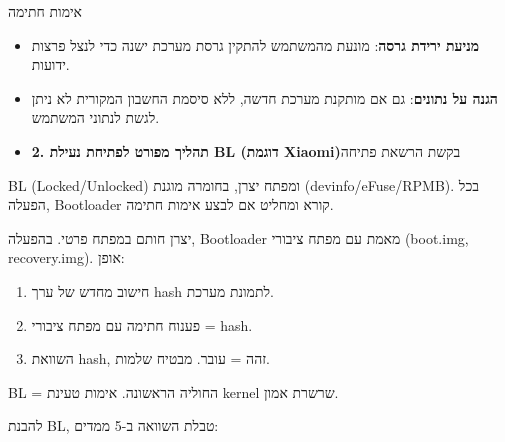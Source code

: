 


אימות חתימה


\begin{itemize}
  \item \textbf{מניעת ירידת גרסה}: מונעת מהמשתמש להתקין גרסת מערכת ישנה כדי לנצל פרצות ידועות.
  \item \textbf{הגנה על נתונים}: גם אם מותקנת מערכת חדשה, ללא סיסמת החשבון המקורית לא ניתן לגשת לנתוני המשתמש.
  \item \textbf{2. תהליך מפורט לפתיחת נעילת BL (דוגמת Xiaomi)}בקשת הרשאת פתיחה
\end{itemize}


BL (Locked/Unlocked) ומפתח יצרן, בחומרה מוגנת (devinfo/eFuse/RPMB). בכל הפעלה, Bootloader קורא ומחליט אם לבצע אימות חתימה.


יצרן חותם במפתח פרטי. בהפעלה, Bootloader מאמת עם מפתח ציבורי (boot.img, recovery.img). אופן:

\begin{enumerate}
  \item חישוב מחדש של ערך hash לתמונת מערכת.
  \item פענוח חתימה עם מפתח ציבורי = hash.
  \item השוואת hash, זהה = עובר. מבטיח שלמות.
\end{enumerate}


BL = החוליה הראשונה. אימות טעינת kernel שרשרת אמון.


להבנת BL, טבלת השוואה ב-5 ממדים:

